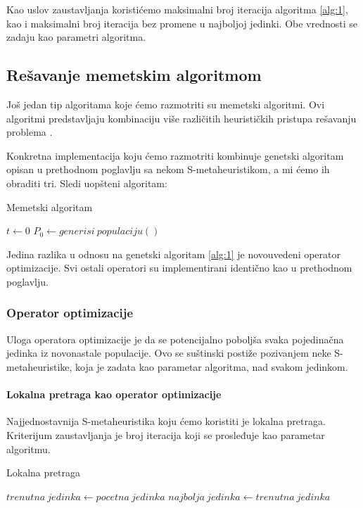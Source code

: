 \documentclass[12pt, a4paper]{article}
\theoremstyle{definition}
\begin{document}
Kao uslov zaustavljanja koristićemo maksimalni broj iteracija algoritma \ref{alg:1}, kao i maksimalni broj iteracija bez promene u najboljoj jedinki. Obe vrednosti se zadaju kao parametri algoritma.

\subsection{Rešavanje memetskim algoritmom}

Još jedan tip algoritama koje ćemo razmotriti su memetski algoritmi. Ovi algoritmi predstavljaju kombinaciju više različitih heurističkih pristupa rešavanju problema \cite{4}.

Konkretna implementacija koju ćemo razmotriti kombinuje genetski algoritam opisan u prethodnom poglavlju sa nekom S-metaheuristikom, a mi ćemo ih obraditi tri. Sledi uopšteni algoritam:

\begin{algorithm}
\caption{Memetski algoritam}
\label{alg:2}
$t \gets 0$\;
$P_0 \gets generisi\ populaciju()$\;
\end{algorithm}

Jedina razlika u odnosu na genetski algoritam \ref{alg:1} je novouvedeni operator optimizacije. Svi ostali operatori su implementirani identično kao u prethodnom poglavlju.

\subsubsection{Operator optimizacije}

Uloga operatora optimizacije je da se potencijalno poboljša svaka pojedinačna jedinka iz novonastale populacije. Ovo se suštinski postiže pozivanjem neke S-metaheuristike, koja je zadata kao parametar algoritma, nad svakom jedinkom.

\paragraph{Lokalna pretraga kao operator optimizacije}

Najjednostavnija S-metaheuristika koju ćemo koristiti je lokalna pretraga. Kriterijum zaustavljanja je broj iteracija koji se prosleđuje kao parametar algoritmu.

\begin{algorithm}
\caption{Lokalna pretraga}
\label{alg:3}
$trenutna\ jedinka \gets pocetna\ jedinka$\;
$najbolja\ jedinka \gets trenutna\ jedinka$\;
\end{algorithm}
\end{document}
